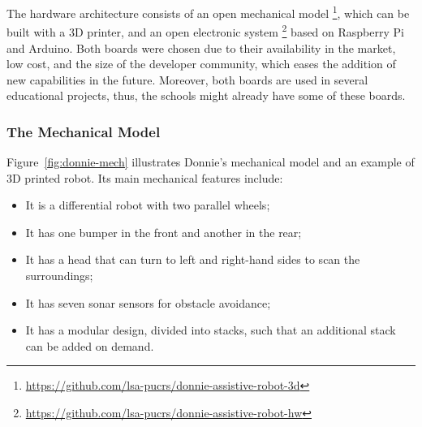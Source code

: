 The hardware architecture consists of an open mechanical model \footnote{\url{https://github.com/lsa-pucrs/donnie-assistive-robot-3d}}, which can be built with a 3D printer, and an open electronic system \footnote{\url{https://github.com/lsa-pucrs/donnie-assistive-robot-hw}} based on Raspberry Pi and Arduino. Both boards were chosen due to their availability in the market, low cost, and the size of the developer community, which eases the addition of new capabilities in the future. Moreover, both boards are used in several educational projects, thus, the schools might already have some of these boards.

\subsubsection{The Mechanical Model}
\label{sec:mech}

Figure~\ref{fig:donnie-mech} illustrates Donnie's mechanical model and an example of 3D printed robot. Its main mechanical features include:

\begin{itemize}
\item It is a differential robot with two parallel wheels;
\item It has one bumper in the front and another in the rear;
\item It has a head that can turn to left and right-hand sides to scan the surroundings;
\item It has seven sonar sensors for obstacle avoidance;
\item It has a modular design, divided into stacks, such that an additional stack can be added on demand.
\end{itemize}



